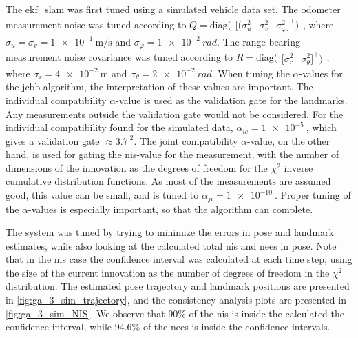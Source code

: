 The \acrshort{ekf_slam} was first tuned using a simulated vehicle data set. The odometer measurement noise was tuned according to $Q = \text{diag}(\begin{array}{ccc}[(\sigma_u^2 & \sigma_v^2 & \sigma_\varphi^2 ]^{\top})\end{array}$, where $\sigma_u = \sigma_v = \SI{1e-1}{\meter\per\second}$ and $\sigma_\varphi = \SI{1e-2}{rad}$. The range-bearing measurement noise covariance was tuned according to $R = \text{diag}(\begin{array}{cc}[\sigma_r^2 & \sigma_\theta^2 ]^{\top})\end{array}$, where $\sigma_r = \SI{4e-2}{\meter}$ and $\sigma_\theta = \SI{2e-2}{rad}$. When tuning the $\alpha$-values for the \acrshort{jcbb} algorithm, the interpretation of these values are important. The individual compatibility $\alpha$-value is used as the validation gate for the landmarks. Any measurements outside the validation gate would not be considered. For the individual compatibility found for the simulated data, $\alpha_{ic} = \SI{1e-5}{}$, which gives a validation gate $\approx \SI{3.7}{}^2$. The joint compatibility $\alpha$-value, on the other hand, is used for gating the \acrshort{nis}-value for the measurement, with the number of dimensions of the innovation as the degrees of freedom for the $\chi^2$ inverse cumulative distribution functions. As most of the measurements are assumed good, this value can be small, and is tuned to $\alpha_{ji} = \SI{1e-10}{}$. Proper tuning of the $\alpha$-values is especially important, so that the algorithm can complete. 

The system was tuned by trying to minimize the errors in pose and landmark estimates, while also looking at the calculated total \acrshort{nis} and \acrshort{nees} in pose. Note that in the \acrshort{nis} case the confidence interval was calculated at each time step, using the size of the current innovation as the number of degrees of freedom in the $\chi^2$ distribution. The estimated pose trajectory and landmark positions are presented in \cref{fig:ga_3_sim_trajectory}, and the consistency analysis plots are presented in \cref{fig:ga_3_sim_NIS}. We observe that 90\% of the \acrshort{nis} is inside the calculated the confidence interval, while 94.6\% of the \acrshort{nees} is inside the confidence intervals. 


